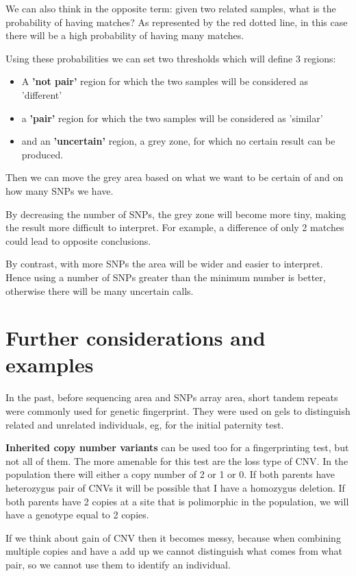 We can also think in the opposite term: given two related samples, what is the probability of having  matches? As represented by the red dotted line, in this case there will be a high probability of having many matches. 

Using these probabilities we can set two thresholds which will define 3 regions:
\begin{itemize}
	\item A \textbf{'not pair'} region for which the two samples will be considered as 'different'
 	\item a \textbf{'pair'} region for which the two samples will be considered as 'similar'
	\item and an \textbf{'uncertain'} region, a grey zone, for which no certain result can be produced. 
\end{itemize}

Then we can move the grey area based on what we want to be certain of and on how many SNPs we have.

By decreasing the number of SNPs, the grey zone will become more tiny, making the result more difficult to interpret. For example, a difference of only 2 matches could lead to opposite conclusions. 

By contrast, with more SNPs the area will be wider and easier to interpret. Hence using a number of SNPs greater than the minimum number is better, otherwise there will be many uncertain calls. 


\section*{Further considerations and examples}
In the past, before sequencing area and SNPs array area, short tandem repeats were commonly used for genetic fingerprint. They were used on gels to distinguish related and unrelated individuals, eg, for the initial paternity test. 

\textbf{Inherited copy number variants} can be used too for a fingerprinting test, but not all of them. The more amenable for this test are the loss type of CNV. In the population there will either a copy number of 2 or 1 or 0. If both parents have heterozygus pair of CNVs it will be possible that I have a homozygus deletion. If both parents have 2 copies at a site that is polimorphic in the population, we will have a genotype equal to 2 copies. 

If we think about gain of CNV then it becomes messy, because when combining multiple copies and have a add up we cannot distinguish what comes from what pair, so we cannot use them to identify an individual.


